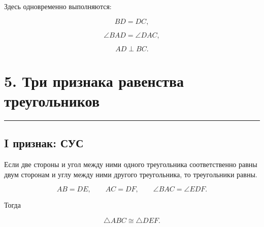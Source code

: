 \documentclass[a4paper,12pt]{article}
\newcommand{\sectionline}{
  \par
  \vspace{0.2em}
  \textcolor{lightline}{\rule{\linewidth}{0.8pt}}
  \par
  \vspace{0.35em}
}
\begin{document}
\begin{center}


\end{center}

Здесь одновременно выполняются:

\[
BD=DC,
\]

\[
\angle BAD=\angle DAC,
\]

\[
AD\perp BC.
\]


\section*{5. Три признака равенства треугольников}
\sectionline

\subsection*{I признак: СУС}

Если две стороны и угол между ними
одного треугольника соответственно равны
двум сторонам и углу между ними другого треугольника,
то треугольники равны.

\[
AB=DE,
\qquad
AC=DF,
\qquad
\angle BAC=\angle EDF.
\]

Тогда

\[
\triangle ABC\cong\triangle DEF.
\]
\end{document}
